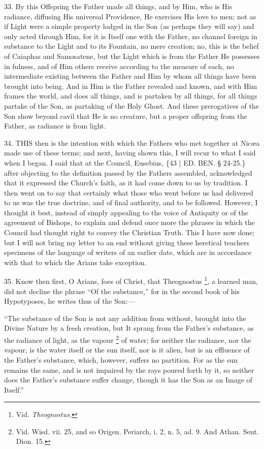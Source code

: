 33. By this Offspring the
Father made all things, and by Him, who is His radiance, diffusing His
universal Providence, He exercises His love to men; not as if Light
were a simple property lodged in the Son (as perhaps they will say)
and only acted through Him, for it is Itself one with the Father, no
channel foreign in substance to the Light and to its Fountain, no mere
creation; no, this is the belief of Caiaphas and Samosatene, but the
Light which is from the Father He possesses in fulness, and of Him
others receive according to the measure of each, no intermediate
existing between the Father and Him by whom all things have been
brought into being. And in Him is the Father revealed and known, and
with Him frames the world, and does all things, and is partaken by all
things, for all things partake of the Son, as partaking of the Holy
Ghost. And these prerogatives of the Son show beyond cavil that He is
no creature, but a proper offspring from the Father, as radiance is
from light.


34. THIS
then is the intention with which the Fathers who met together at Nicæa
made use of these terms; and next, having shown this, I will recur to
what I said when I began. I said that at the Council, Eusebius, \{43 |
ED.
BEN.
§ 24-25.\} after objecting to the definition passed by the Fathers
assembled, acknowledged that it expressed the Church's faith, as it
had come down to us by tradition. I then went on to say that certainly
what those who went before us had delivered to us was the true
doctrine, and of final authority, and to be followed. However, I
thought it best, instead of simply appealing to the voice of Antiquity
or of the agreement of Bishops, to explain and defend once more the
phrases in which the Council had thought right to convey the Christian
Truth. This I have now done; but I will not bring my letter to an end
without giving these heretical teachers specimens of the language of
writers of an earlier date, which are in accordance with that to which
the Arians take exception.

35. Know then first, O Arians,
foes of Christ, that Theognostus \footnote{Vid. \emph{Theognostus}.}, a learned man, did not decline the phrase ``Of the substance,''
for in the second book of his Hypotyposes, he writes thus of the
Son:—


``The substance of the Son is
not any addition from without, brought into the Divine Nature by a
fresh creation, but It sprang from the Father's substance, as the
radiance of light, as the vapour \footnote{Vid. Wisd. vii. 25, and so Origen. Periarch, i. 2, n. 5, ad. 9. And
Athan. Sent. Dion. 15.} of water; for neither the radiance, nor the vapour, is the
water itself or the sun itself, nor is it alien, but is an effluence
of the Father's substance, which, however, suffers no partition. For
as the sun remains the same, and is not impaired by the rays poured
forth by it, so neither does the Father's substance suffer change,
though it has the Son as an Image of Itself.''

